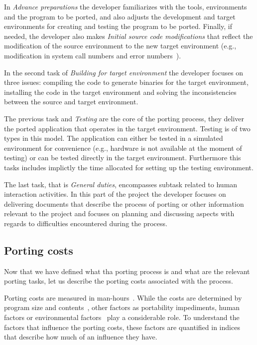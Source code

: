 In \textit{Advance preparations} the developer familiarizes with the tools,
environments and the program to be ported, and also adjusts the development and
target environments for creating and testing the program to be ported. Finally,
if needed, the developer also makes \textit{Initial source code modifications}
that reflect the modification of the source environment to the new target
environment (e.g., modification in system call numbers and error
numbers~\cite{b22}).

In the second task of \textit{Building for target environment} the developer
focuses on three issues: compiling the code to generate binaries for the
target environment, installing the code in the target environment and solving
the inconsistencies between the source and target environment.

The previous task and \textit{Testing} are the core of the porting process, they
deliver the ported application that operates in the target environment.
Testing is of two types in this model. The application can either be tested in a
simulated environment for convenience (e.g., hardware is not available at the
moment of testing) or can be tested directly in the target environment.
Furthermore this tasks includes implictly the time allocated for setting up the
testing environment.

The last task, that is \textit{General duties}, encompasses subtask related to
human interaction activities. In this part of the project the developer focuses
on delivering documents that describe the process of porting or other
information relevant to the project and focuses on planning and discussing
aspects with regards to difficulties encountered during the process.

\subsection{Porting costs}

Now that we have defined what tha porting process is and what are the relevant
porting tasks, let us describe the porting costs associated with the process.

Porting costs are measured in man-hours~\cite{b1, b2}. While the costs are
determined by program size and contents~\cite{b2}, other factors as portability
impediments, human factors or environmental factors~\cite{b2} play a
considerable role. To understand the factors that influence the porting costs,
these factors are quantified in indices that describe how much of an influence
they have.

